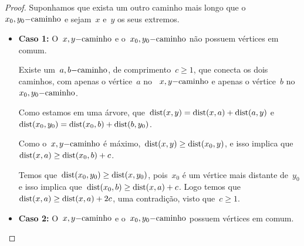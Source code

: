 	\begin{proof}
		Suponhamos que exista um outro caminho mais longo que 
		o~$x_0,y_0\mathrm{-caminho}$ e sejam~$x$ e~$y$ os seus extremos.

		\begin{itemize}
	        \item \textbf{Caso 1:} O~$x,y\mathrm{-caminho}$ e 
	        o~$x_0,y_0\mathrm{-caminho}$ não possuem vértices em comum.

	        Existe um~$a,b\mathrm{-caminho}$, de 
	        comprimento~$c \ge 1$, que conecta os dois caminhos, 
	        com apenas o vértice~$a$ 
	        no ~$x,y\mathrm{-caminho}$ e apenas o vértice~$b$ 
	        no~$x_0,y_0\mathrm{-caminho}$.

	        \begin{center}  \end{center}


	        Como estamos em uma árvore,
	        que~${\mathrm{dist}(x,y) =\mathrm{dist}(x,a)+\mathrm{dist}(a,y)}$
	        e~${\mathrm{dist}(x_0,y_0) =\mathrm{dist}(x_0,b)+\mathrm{dist}(b,y_0)}$.

	        Como o~$x,y\mathrm{-caminho}$ é 
	        máximo,~${\mathrm{dist}(x,y)\ge \mathrm{dist}(x_0,y)}$,
	        e isso implica que~${\mathrm{dist}(x,a)\ge \mathrm{dist}(x_0,b)+c}$.
 			
 			Temos que~${\mathrm{dist}(x_0,y_0)\ge \mathrm{dist}(x,y_0)}$,
	        pois~$x_0$ é um vértice mais distante de~$y_0$ e isso implica 
	        que~${\mathrm{dist}(x_0,b)\ge \mathrm{dist}(x,a)+c}$.
	        Logo temos 
	        que~${\mathrm{dist}(x,a)\ge \mathrm{dist}(x, a)+2c}$,
	        uma contradição, visto que~${c\ge 1}$.


			\bigskip
			\bigskip
			\bigskip


			\item \textbf{Caso 2:} O~$x,y\mathrm{-caminho}$ e 
			o~$x_0,y_0\mathrm{-caminho}$ possuem vértices em comum.


\end{itemize}
\end{proof}
